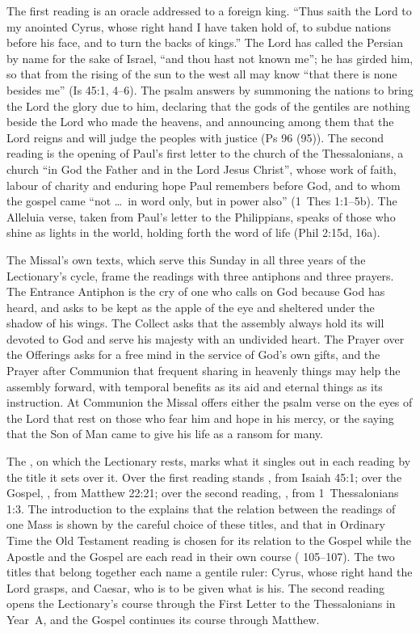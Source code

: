 The first reading is an oracle addressed to a foreign king. ``Thus saith the
Lord to my anointed Cyrus, whose right hand I have taken hold of, to subdue
nations before his face, and to turn the backs of kings.'' The Lord has called
the Persian by name for the sake of Israel, ``and thou hast not known me'';
he has girded him, so that from the rising of the sun to the west all may
know ``that there is none besides me'' (Is 45:1, 4--6). The psalm answers by
summoning the nations to bring the Lord the glory due to him, declaring that
the gods of the gentiles are nothing beside the Lord who made the heavens, and
announcing among them that the Lord reigns and will judge the peoples with
justice (Ps 96 (95)). The second reading is the opening of Paul's first letter
to the church of the Thessalonians, a church ``in God the Father and in the
Lord Jesus Christ'', whose work of faith, labour of charity and enduring hope
Paul remembers before God, and to whom the gospel came ``not \ldots\ in word
only, but in power also'' (1~Thes 1:1--5b). The Alleluia verse, taken from
Paul's letter to the Philippians, speaks of those who shine as lights in the
world, holding forth the word of life (Phil 2:15d, 16a).

The Missal's own texts, which serve this Sunday in all three years of the
Lectionary's cycle, frame the readings with three antiphons and three prayers.
The Entrance Antiphon is the cry of one who calls on God because God has heard,
and asks to be kept as the apple of the eye and sheltered under the shadow of
his wings. The Collect asks that the assembly always hold its will devoted to
God and serve his majesty with an undivided heart. The Prayer over the
Offerings asks for a free mind in the service of God's own gifts, and the
Prayer after Communion that frequent sharing in heavenly things may help the
assembly forward, with temporal benefits as its aid and eternal things as its
instruction. At Communion the Missal offers either the psalm verse on the eyes
of the Lord that rest on those who fear him and hope in his mercy, or the
saying that the Son of Man came to give his life as a ransom for many.

The , on which the Lectionary rests, marks what it
singles out in each reading by the title it sets over it. Over the first
reading stands , from Isaiah 45:1; over the Gospel, , from Matthew 22:21; over the second reading,
, from 1~Thessalonians 1:3.
The introduction to the  explains that the relation between the
readings of one Mass is shown by the careful choice of these titles, and that
in Ordinary Time the Old Testament reading is chosen for its relation to the
Gospel while the Apostle and the Gospel are each read in their own course
( 105--107). The two titles that belong together each name a
gentile ruler: Cyrus, whose right hand the Lord grasps, and Caesar, who is to
be given what is his. The second reading opens the Lectionary's course through
the First Letter to the Thessalonians in Year~A, and the Gospel continues its
course through Matthew.

